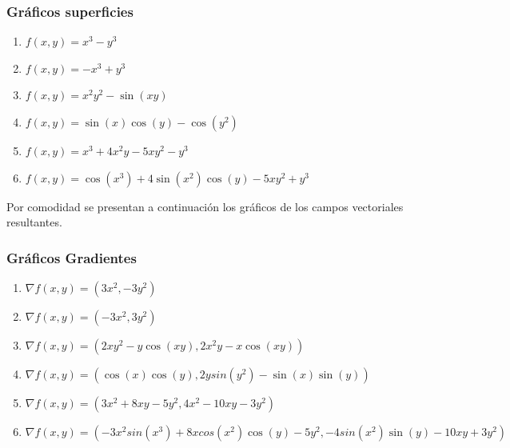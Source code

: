 \subsubsection*{Gráficos superficies}
\begin{enumerate}
    \item $ f(x,y) = x^3-y^3 $
    \item $f(x,y) = -x^3+y^3$
    \item $ f(x,y) = x^2 y^2 -\sin{(xy)}$
    \item $ f(x,y) = \sin{(x)}\cos{(y)} -\cos{(y^2)}$
    \item $ f(x,y) = x^3+4x^2y - 5xy^2-y^3  $
    \item $ f(x,y) = \cos{(x^3)} + 4\sin{(x^2)}\cos{(y)}-5xy^2+y^3 $
\end{enumerate}
Por comodidad se presentan a continuación los gráficos de los campos vectoriales resultantes.
\subsubsection*{Gráficos Gradientes}
\begin{enumerate}
    \item $ \nabla f(x,y) = \left(3x^2 , -3y^2 \right) $
    \item $ \nabla f(x,y) = \left(-3x^2 , 3y^2 \right) $
    \item $ \nabla f(x,y) = \left(2xy^2-y\cos(xy) , 2x^2y-x\cos(xy) \right) $
    \item $ \nabla f(x,y) = \left(\cos(x)\cos(y), 2ysin(y^2)-\sin(x)\sin(y) \right) $
    \item $ \nabla f(x,y) = \left(3x^2+8xy-5y^2, 4x^2 -10xy - 3y^2\right) $
    \item $ \nabla f(x,y) = \left(-3x^2sin(x^3) + 8xcos(x^2)\cos(y) - 5y^2, -4sin(x^2)\sin(y)-10xy + 3y^2\right) $
\end{enumerate}

